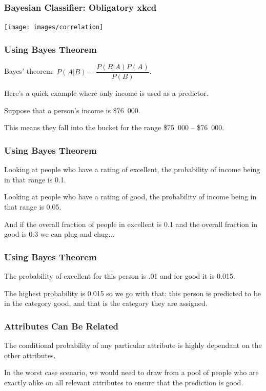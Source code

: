 \begin{frame}
\frametitle{Bayesian Classifier: Obligatory xkcd}

\begin{center}
	\texttt{[image: images/correlation]}
\end{center}


\end{frame}


\begin{frame}
\frametitle{Using Bayes Theorem}

Bayes' theorem: $P(A|B) = \dfrac{P(B|A)P(A)}{P(B)}$. 

Here's a quick example where only income is used as a predictor. 

Suppose that a person's income is \$76~000. 

This means they fall into the bucket for the range \$75~000 -- \$76~000.

\end{frame}


\begin{frame}
\frametitle{Using Bayes Theorem}

Looking at people who have a rating of excellent, the probability of income being in that range is 0.1. 

Looking at people who have a rating of good, the probability of income being in that range is 0.05.

 And if the overall fraction of people in excellent is 0.1 and the overall fraction in good is 0.3 we can plug and chug...
 
 \end{frame}


\begin{frame}
\frametitle{Using Bayes Theorem}
 
The probability of excellent for this person is .01 and for good it is 0.015. 

The highest probability is 0.015 so we go with that: this person is predicted to be in the category good, and that is the category they are assigned.

\end{frame}

\begin{frame}
\frametitle{Attributes Can Be Related}

The conditional probability of any particular attribute is highly dependant on the other attributes. 

In the worst case scenario, we would need to draw from a pool of people who are exactly alike on all relevant attributes to ensure that the prediction is good.

\end{frame}

